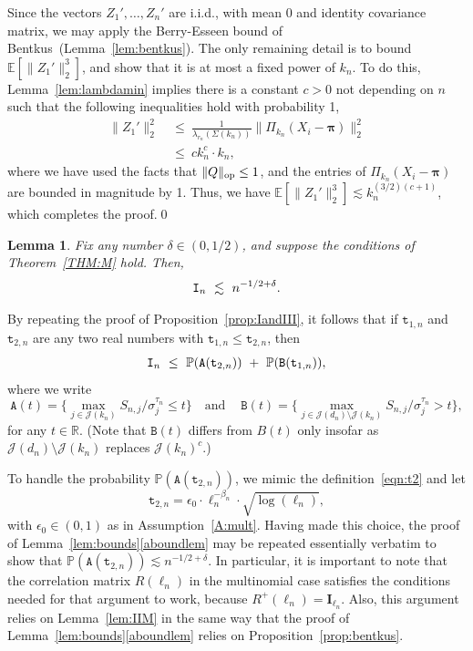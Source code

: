 \documentclass[aos,preprint]{imsart}
\numberwithin{equation}{section}
\theoremstyle{plain}
\newtheorem{lemma}{Lemma}[section]
\newcommand{\R}{\mathbb{R}}
\newcommand{\bI}{\textup{\texttt{I}}}
\newcommand{\J}{\mathcal{J}}
\renewcommand{\P}{\mathbb{P}}
\newcommand{\E}{\mathbb{E}}
\newcommand{\e}{\epsilon}
\newcommand{\op}{_{\textup{op}}}
\newcommand{\ts}{\textstyle}
\newcommand{\1}{{\bf{1}}}
\newcommand{\0}{\mathbf{0}}
\begin{document}
Since the vectors $Z_1',\dots,Z_n'$ are i.i.d., with mean 0 and identity covariance matrix, we may apply the Berry-Esseen bound of Bentkus~(Lemma~\ref{lem:bentkus}). The only remaining detail is to bound $\E[\|Z_1'\|_2^3]$, and show that it is at most a fixed power of $k_n$. To do this, Lemma~\ref{lem:lambdamin} implies there is a constant $c>0$ not depending on $n$ such that the following inequalities hold with probability 1,
\begin{equation*}
\begin{split}
\|Z_1'\|_2^2  & \ \leq \ \ts\frac{1}{\lambda_{r_n}(\Sigma(k_n))}\big\|\Pi_{k_n}(X_i-\boldsymbol\pi)\big\|_2^2\\[0.2cm]
%
& \ \leq \ ck_n^c \cdot k_n,
\end{split}
\end{equation*}
where we have used the facts that $\|Q\|\op\leq 1$, and the entries of $\Pi_{k_n}(X_i-\boldsymbol\pi)$ are bounded in magnitude by 1. Thus, we have $\E[\|Z_1'\|_2^3]\lesssim k_n^{(3/2)(c+1)}$, which completes the proof.\qed


\begin{lemma}\label{lem:IM}
Fix any number $\delta\in(0,1/2)$, and suppose the conditions of Theorem~\ref{THM:M} hold. Then,
\begin{equation}
\bI_n \ \lesssim \ n^{-1/2+\delta}.
\end{equation}
\end{lemma}
\proof By repeating the proof of Proposition~\ref{prop:IandIII}, it follows that if $\texttt{t}_{1,n}$ and $\texttt{t}_{2,n}$ are any two real numbers with $\texttt{t}_{1,n}\leq \texttt{t}_{2,n}$, then 
\begin{equation}
\bI_n \ \leq \ \P(\texttt{A}(\texttt{t}_{2,n})) \ + \ \P(\texttt{B}(\texttt{t}_{1,n})),
\end{equation}
where we write
\small
\begin{equation*}
\texttt{A}(t)=\Big\{\max_{j\in\J(k_n)} S_{n,j}/\sigma_j^{\tau_n} \leq t\Big\} \ \ \ \text{ and } \ \  \ \ \texttt{B}(t)=\Big\{\max_{j\in\J(d_n)\setminus\J(k_n)} S_{n,j}/\sigma_j^{\tau_n}> t\Big\},
\end{equation*}
\normalsize
for any $t\in \R$. (Note that $\texttt{B}(t)$ differs from $B(t)$ only insofar as $\J(d_n)\setminus\J(k_n)$ replaces $\J(k_n)^c$.)

To handle the probability $\P(\texttt{A}(\texttt{t}_{2,n}))$, we mimic the definition~\eqref{eqn:t2} and let
\begin{equation}
 \texttt{t}_{2,n}=\e_0\cdot \ell_n^{-\beta_n}\cdot \sqrt{\log(\ell_n)},  
\end{equation}
with $\e_0\in(0,1)$ as in Assumption~\ref{A:mult}. Having made this choice, the proof of Lemma~\ref{lem:bounds}\eqref{aboundlem} may be repeated essentially verbatim to show that $\P(\texttt{A}(\texttt{t}_{2,n}))\lesssim n^{-1/2+\delta}$. In particular, it is important to note that the correlation matrix $R(\ell_n)$ in the multinomial case satisfies the conditions needed for that argument to work, because $R^+(\ell_n)=\mathbf{I}_{\ell_n}$. Also, this argument relies on Lemma~\ref{lem:IIM} in the same way that the proof of Lemma~\ref{lem:bounds}\eqref{aboundlem} relies on Proposition~\ref{prop:bentkus}.
\end{document}
